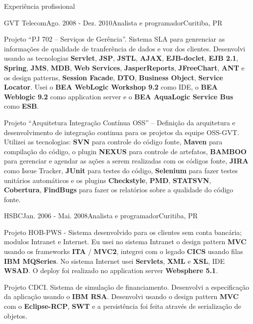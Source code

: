 \documentclass{resume}
\begin{document}
\begin{rSection}{Experiência profissional}
\begin{rSubsection}{GVT Telecom}{Ago. 2008 - Dez. 2010}{Analista e programador}{Curitiba, PR}
    \item Projeto “PJ 702 – Serviços de Gerência”. Sistema SLA para genrenciar as informações de qualidade de tranferência de dados e voz dos clientes. Desenvolvi usando as tecnologias \textbf{Servlet}, \textbf{JSP}, \textbf{JSTL}, \textbf{AJAX}, \textbf{EJB-doclet}, \textbf{EJB 2.1}, \textbf{Spring}, \textbf{JMS}, \textbf{MDB}, \textbf{Web Services}, \textbf{JasperReports}, \textbf{JFreeChart}, \textbf{ANT} e os design patterns, \textbf{Session Facade}, \textbf{DTO}, \textbf{Business Object}, \textbf{Service Locator}. Usei o \textbf{BEA WebLogic Workshop 9.2} como IDE, o \textbf{BEA Weblogic 9.2} como application server e o \textbf{BEA AquaLogic Service Bus} como \textbf{ESB}.\\
    \item Projeto “Arquitetura Integração Contínua OSS” – Definição da arquitetura e desenvolvimento de integração continua para os projetos da equipe OSS-GVT. Utilizei as tecnologias: \textbf{SVN} para controle do código fonte, \textbf{Maven} para compilação do código, o plugin \textbf{NEXUS} para controle de artefatos, \textbf{BAMBOO} para gerenciar e agendar as ações a serem realizadas com os códigos fonte, \textbf{JIRA} como Issue Tracker, \textbf{JUnit} para testes do código, \textbf{Selenium} para fazer testes unitários automáticos e os plugins \textbf{Checkstyle}, \textbf{PMD}, \textbf{STATSVN}, \textbf{Cobertura}, \textbf{FindBugs} para fazer os relatórios sobre a qualidade do código fonte.
    \end{rSubsection}
    \begin{rSubsection}{HSBC}{Jan. 2006 - Mai. 2008}{Analista e programador}{Curitiba, PR}
    \item Projeto HOB-PWS - Sistema desenvolvido para os clientes sem conta bancária; modulos Intranet e Internet. Eu usei no sistema Intranet o design pattern \textbf{MVC} usando os frameworks \textbf{ITA} / \textbf{MVC2}, integrei com o legado \textbf{CICS} usando filas \textbf{IBM MQSeries}. No sistema Internet usei \textbf{Servlets}, \textbf{XML} e \textbf{XSL}, IDE \textbf{WSAD}. O deploy foi realizado no application server \textbf{Websphere 5.1}.\\
    \item Projeto CDCI. Sistema de simulação de financiamento. Desenvolvi a especificação da aplicação usando o \textbf{IBM RSA}. Desenvolvi usando o design pattern \textbf{MVC} com o \textbf{Eclipse-RCP}, \textbf{SWT} e a persistência foi feita através de serialização de objetos.\\

\end{rSubsection}
\end{rSection}
\end{document}
